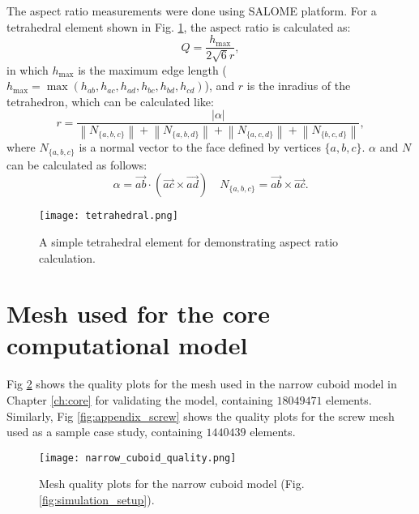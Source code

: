 The aspect ratio measurements were done using SALOME platform. For a  tetrahedral element shown in Fig. \ref{fig:appendix_tetrahedral}, the aspect ratio is calculated as:
\begin{equation}
Q=\frac{h_{\max }}{2 \sqrt{6} r},
\end{equation}
in which $h_{\max}$ is the maximum edge length ($h_{\max }=\max \left(h_{a b}, h_{a c}, h_{a d}, h_{b c}, h_{b d}, h_{c d}\right)$), and $r$ is the inradius of the tetrahedron, which can be calculated like: 
\begin{equation}
r=\frac{|\alpha|}{\left\|N_{\{a, b, c\}}\right\|+\left\|N_{\{a, b, d\}}\right\|+\left\|N_{\{a, c, d\}}\right\|+\left\|N_{\{b, c, d\}}\right\|},
\end{equation} 
where $N_{\{a, b, c\}}$ is a normal vector to the face defined by vertices $\{a, b, c\}$. $\alpha$ and $N$ can be calculated as follows:
\begin{equation}
\alpha=\overrightarrow{a b} \cdot(\overrightarrow{a c} \times \overrightarrow{a d}) \quad N_{\{a, b, c\}}=\overrightarrow{a b} \times \overrightarrow{a c}.
\end{equation}


\begin{figure}[h]
\centering
\medskip
\texttt{[image: tetrahedral.png]}
\caption[A simple tetrahedral element for demonstrating aspect ratio calculation]{A simple tetrahedral element for demonstrating aspect ratio calculation.} \label{fig:appendix_tetrahedral}
\end{figure}


\section{Mesh used for the core computational model}

Fig \ref{fig:appendix_narrow_cuboid} shows the quality plots for the mesh used in the narrow cuboid model in Chapter \ref{ch:core} for validating the model, containing $\num{18049471}$ elements. Similarly, Fig \ref{fig:appendix_screw} shows the quality plots for the screw mesh used as a sample case study, containing $\num{1440439}$ elements.

\begin{figure}[h]
\centering
\medskip
\texttt{[image: narrow\_cuboid\_quality.png]}
\caption[Mesh quality plots for the narrow cuboid model]{Mesh quality plots for the narrow cuboid model (Fig. \ref{fig:simulation_setup}).} \label{fig:appendix_narrow_cuboid}
\end{figure}

